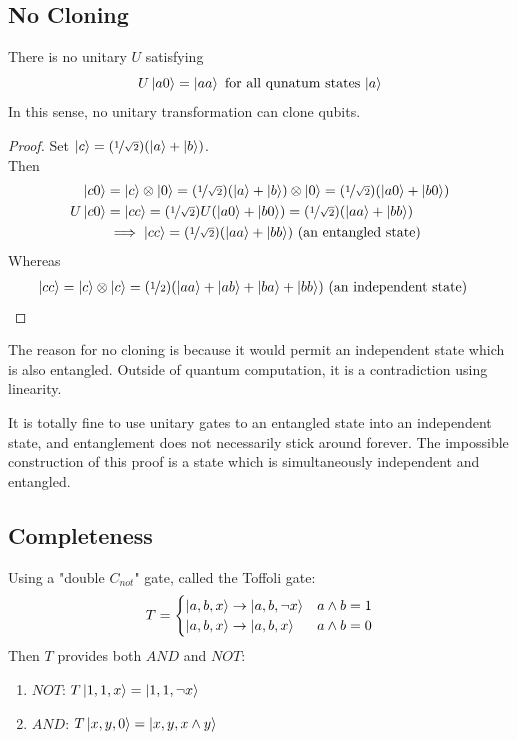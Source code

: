 \documentclass{article}
\begin{document}
\subsection{No Cloning}
\begin{theo}[No Cloning]
There is no unitary $U$ satisfying
\begin{equation}
    U \ket{a0} = \ket{aa} \text{ for all qunatum states $\ket{a}$}
\end{equation}
In this sense, no unitary transformation can clone qubits.
\end{theo}
\begin{proof}
Set $\ket{c} = (\nicefrac{1}{\sqrt{2}})(\ket{a} + \ket{b})$. \\
Then
\begin{align}
    \ket{c0} & = \ket{c}\otimes \ket{0} = (\nicefrac{1}{\sqrt{2}}) (\ket{a} + \ket{b}) \otimes \ket{0} =  (\nicefrac{1}{\sqrt{2}}) (\ket{a0} + \ket{b0})  \\
    U \ket{c0} & = \ket{cc} =  (\nicefrac{1}{\sqrt{2}}) U (\ket{a0} + \ket{b0}) = (\nicefrac{1}{\sqrt{2}}) (\ket{aa} + \ket{bb}) \\
    & \implies \ket{cc} = (\nicefrac{1}{\sqrt{2}}) (\ket{aa} + \ket{bb})  \text{ (an entangled state)}\\
\end{align}
Whereas
\begin{align}
    \ket{cc} & = \ket{c} \otimes \ket{c} = (\nicefrac{1}{2}) (\ket{aa} + \ket{ab} + \ket{ba} + \ket{bb}) \text{ (an independent state)}
\end{align}
\end{proof}
\begin{rem}
The reason for no cloning is because it would permit an independent state which is also entangled. Outside of quantum computation, it is a contradiction using linearity.
\end{rem}
\begin{rem}
It is totally fine to use unitary gates to  an entangled state into an independent state, and entanglement does not necessarily stick around forever. The impossible construction of this proof is a state which is simultaneously independent and entangled.
\end{rem}

\subsection{Completeness}
Using a "double $C_{not}$" gate, called the Toffoli gate:
\begin{align}
    T = \begin{cases}
        \ket{a,b,x} \to \ket{a,b, \lnot x} & a \land b = 1 \\
        \ket{a,b,x} \to \ket{a,b,x} & a \land b = 0 
    \end{cases}
\end{align}
Then $T$ provides both $AND$ and $NOT$:
\begin{enumerate}
    \item $NOT$: $T\ket{1,1,x} = \ket{1,1,\lnot x}$
    \item $AND$: $T\ket{x,y,0} = \ket{x,y,x \land y}$
\end{enumerate}
\end{document}
